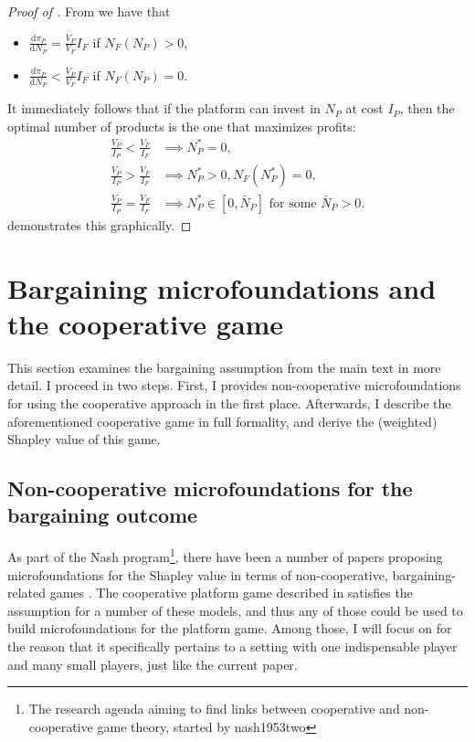 \documentclass[a4paper]{article}
\newcommand{\dd}{\mathrm{d}}
\begin{document}
\begin{proof}[Proof of ]
    From  we have that
    \begin{itemize}
        \item $\frac{\dd \pi_P}{\dd N_P} = \frac{V_P}{V_F} I_F$ if $N_F(N_P) > 0$,
        \item $\frac{\dd \pi_P}{\dd N_P} < \frac{V_P}{V_F} I_F$ if $N_F(N_P) = 0$.
    \end{itemize}
    It immediately follows that if the platform can invest in $N_P$ at cost $I_P$, then the optimal number of products is the one that maximizes profits:
    \begin{align*}
        \frac{V_P}{I_P} < \frac{V_F}{I_F} &\implies N_P^* = 0, \\
        \frac{V_P}{I_P} > \frac{V_F}{I_F} &\implies N_P^* > 0, N_F(N_P^*) = 0, \\
        \frac{V_P}{I_P} = \frac{V_F}{I_F} &\implies N_P^* \in [0, \bar{N}_P] \text{ for some } \bar{N}_P > 0.
    \end{align*}
     demonstrates this graphically.
\end{proof}

\section{Bargaining microfoundations and the cooperative game}
This section examines the bargaining assumption from the main text in more detail.
I proceed in two steps.
First, I provides non-cooperative microfoundations for using the cooperative approach in the first place.
Afterwards, I describe the aforementioned cooperative game in full formality, and derive the (weighted) Shapley value of this game.


\subsection{Non-cooperative microfoundations for the bargaining outcome}
\label{sec:bargaining_microfoundation}

As part of the Nash program\footnote{
    The research agenda aiming to find links between cooperative and non-cooperative game theory, started by nash1953two
}, there have been a number of papers proposing microfoundations for the Shapley value in terms of non-cooperative, bargaining-related games \parencite[e.g.][]{gul1989bargaining,winter1994demand,hart1996bargaining,stole1996intra}.
The cooperative platform game described in  satisfies the assumption for a number of these models, and thus any of those could be used to build microfoundations for the platform game.
Among those, I will focus on \textcite{stole1996intra} for the reason that it specifically pertains to a setting with one indispensable player and many small players, just like the current paper.
\end{document}
